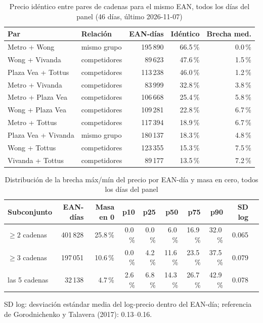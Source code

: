 
\begin{table}[htbp]
\caption{Precio id\'entico entre pares de cadenas para el mismo EAN, todos los d\'ias del panel (46 d\'ias, \'ultimo 2026-11-07)}
\label{tab:identidad}
\centering\scriptsize\setlength{\tabcolsep}{3pt}
\begin{tabular}{@{}llrrr@{}}
\toprule
Par & Relaci\'on & EAN-d\'ias & Id\'entico & Brecha med. \\
\midrule
Metro + Wong & mismo grupo & 195\,890 & 66.5\,\% & 0.0\,\% \\
Wong + Vivanda & competidores & 89\,623 & 47.6\,\% & 1.5\,\% \\
Plaza Vea + Tottus & competidores & 113\,238 & 46.0\,\% & 1.2\,\% \\
Metro + Vivanda & competidores & 83\,999 & 32.8\,\% & 3.8\,\% \\
Metro + Plaza Vea & competidores & 106\,668 & 25.4\,\% & 5.8\,\% \\
Wong + Plaza Vea & competidores & 109\,281 & 22.8\,\% & 6.7\,\% \\
Metro + Tottus & competidores & 117\,394 & 18.9\,\% & 6.7\,\% \\
Plaza Vea + Vivanda & mismo grupo & 180\,137 & 18.3\,\% & 4.8\,\% \\
Wong + Tottus & competidores & 123\,355 & 15.3\,\% & 7.5\,\% \\
Vivanda + Tottus & competidores & 89\,177 & 13.5\,\% & 7.2\,\% \\
\bottomrule\end{tabular}\end{table}

\begin{table}[t]
\caption{Distribuci\'on de la brecha m\'ax/m\'in del precio por EAN-d\'ia y masa en cero, todos los d\'ias del panel}
\label{tab:brecha}
\centering\scriptsize\setlength{\tabcolsep}{4pt}
\begin{tabular}{@{}lrrrrrrrrr@{}}
\toprule
Subconjunto & EAN-d\'ias & Masa en 0 & p10 & p25 & p50 & p75 & p90 & SD log \\
\midrule
$\geq 2$ cadenas & 401\,828 & 25.8\,\% & 0.0\,\% & 0.0\,\% & 6.0\,\% & 16.9\,\% & 32.0\,\% & 0.065 \\
$\geq 3$ cadenas & 197\,051 & 10.6\,\% & 0.0\,\% & 4.2\,\% & 11.6\,\% & 23.5\,\% & 37.5\,\% & 0.079 \\
las 5 cadenas & 32\,138 & 4.7\,\% & 2.6\,\% & 6.8\,\% & 14.3\,\% & 26.7\,\% & 42.9\,\% & 0.078 \\
\bottomrule\end{tabular}
\par\smallskip\raggedright\scriptsize SD log: desviaci\'on est\'andar media del log-precio dentro del EAN-d\'ia; referencia de Gorodnichenko y Talavera (2017): 0.13--0.16.
\end{table}

